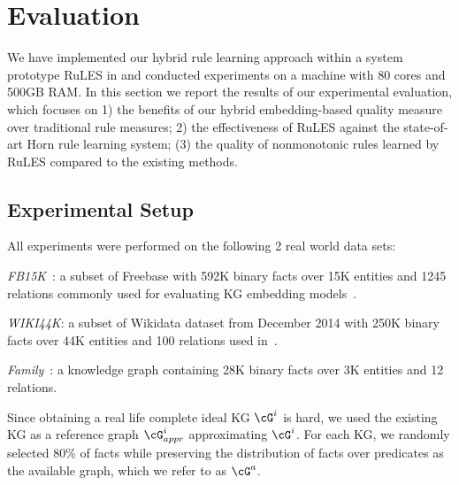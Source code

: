 
\section{Evaluation}
We have implemented our hybrid rule learning approach within a %
system prototype RuLES in %
and conducted experiments on a machine with 80 cores and 500GB RAM.
In this section we report %
the results of our experimental evaluation, which focuses on 1) the benefits of our hybrid embedding-based quality measure over traditional rule measures; 2) the effectiveness of RuLES against the state-of-art Horn rule learning system; (3) the quality of nonmonotonic rules learned by RuLES compared to the existing methods.

\subsection{Experimental Setup}
All experiments were performed on %
the following %
2 real world data sets: 
\squishlist
\item \textit{FB15K}~\cite{Bordes:NIPS2013}: a subset of Freebase with 592K binary facts over 15K entities and 1245 relations %
commonly used for evaluating KG embedding models~\cite{DBLP:journals/tkde/WangMWG17}.
\item \textit{WIKI44K}: a subset of %
Wikidata dataset from December 2014 with 250K binary facts over 44K entities and 100 relations %
used in~\cite{amie}.

\item \textit{Family}~\cite{NeuralLP}: a knowledge graph containing 28K binary facts over 3K entities and 12 relations. 
\squishend

Since obtaining a real life complete ideal KG $\cG^i$ is hard, we used the existing %
KG as a reference graph $\cG^i_{appr}$ approximating $\cG^i$. For each KG, we randomly selected $80\%$ of facts while preserving the distribution of facts over predicates 
 as the available graph, which we refer to as $\cG^a$.

